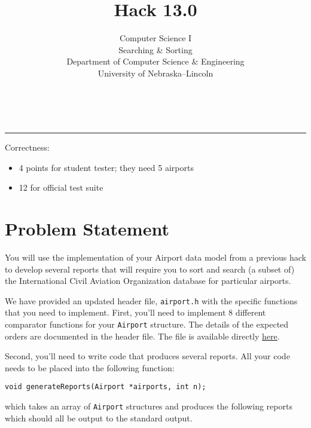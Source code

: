 \documentclass[12pt]{scrartcl}
\title{Hack 13.0}\let\Title\@title
\subtitle{Computer Science I\\
Searching \& Sorting\\
{\small
\vskip1cm
Department of Computer Science \& Engineering \\
University of Nebraska--Lincoln}
\vskip-3cm}
\date{~}
\begin{document}
\maketitle

\hrule



Correctness:
\begin{itemize}
  \item 4 points for student tester; they need 5 airports
  \item 12 for official test suite
\end{itemize}

\section*{Problem Statement}

You will use the implementation of your Airport data model from a previous
hack to develop several reports that will require you to sort and search
(a subset of) the International Civil Aviation Organization database for
particular airports.  

We have provided an updated header file, \texttt{airport.h} with
the specific functions that you need to implement.  First, you'll need to
implement 8 different comparator functions for your \texttt{Airport}
structure.  The details of the expected orders are documented in the header
file.  The file is available directly \href{https://github.com/cbourke/ComputerScienceI/blob/master/hacks/hack13.0-files/airport.h}{here}.

Second, you'll need to write code that produces several reports.  All your
code needs to be placed into the following function:

\texttt{void generateReports(Airport *airports, int n);}

which takes an array of \texttt{Airport} structures and produces the
following reports which should all be output to the standard output.
\end{document}
